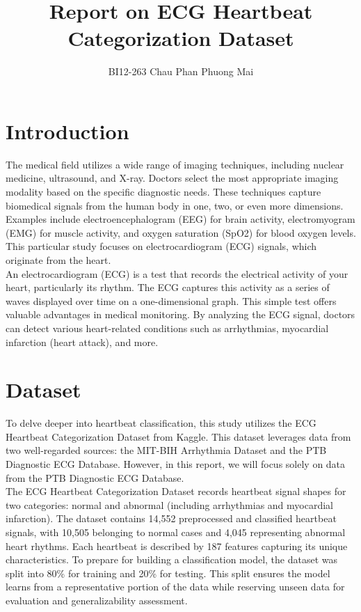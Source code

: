 \documentclass{article}
\title{Report on ECG Heartbeat Categorization Dataset}
\author{BI12-263 Chau Phan Phuong Mai}
\begin{document}
\maketitle

\section{Introduction}

\noindent The medical field utilizes a wide range of imaging techniques, including nuclear medicine, ultrasound, and X-ray. Doctors select the most appropriate imaging modality based on the specific diagnostic needs. These techniques capture biomedical signals from the human body in one, two, or even more dimensions. Examples include electroencephalogram (EEG) for brain activity, electromyogram (EMG) for muscle activity, and oxygen saturation (SpO2) for blood oxygen levels. This particular study focuses on electrocardiogram (ECG) signals, which originate from the heart. \\

\noindent An electrocardiogram (ECG) is a test that records the electrical activity of your heart, particularly its rhythm. The ECG captures this activity as a series of waves displayed over time on a one-dimensional graph. This simple test offers valuable advantages in medical monitoring. By analyzing the ECG signal, doctors can detect various heart-related conditions such as arrhythmias, myocardial infarction (heart attack), and more.\\

\section{Dataset}
\noindent To delve deeper into heartbeat classification, this study utilizes the ECG Heartbeat Categorization Dataset from Kaggle. This dataset leverages data from two well-regarded sources: the MIT-BIH Arrhythmia Dataset and the PTB Diagnostic ECG Database. However, in this report, we will focus solely on data from the PTB Diagnostic ECG Database. \\

\noindent The ECG Heartbeat Categorization Dataset records heartbeat signal shapes for two categories: normal and abnormal (including arrhythmias and myocardial infarction). The dataset contains 14,552 preprocessed and classified heartbeat signals, with 10,505 belonging to normal cases and 4,045 representing abnormal heart rhythms. Each heartbeat is described by 187 features capturing its unique characteristics. To prepare for building a classification model, the dataset was split into 80\% for training and 20\% for testing. This split ensures the model learns from a representative portion of the data while reserving unseen data for evaluation and generalizability assessment. \\
\end{document}
